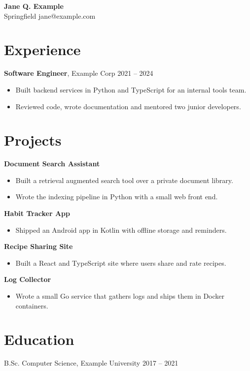 \documentclass[11pt]{article}
\begin{document}
{\LARGE \textbf{Jane Q. Example}}\\
Springfield \quad jane@example.com

\section*{Experience}
\textbf{Software Engineer}, Example Corp \hfill 2021 -- 2024
\begin{itemize}
  \item Built backend services in Python and TypeScript for an internal tools team.
  \item Reviewed code, wrote documentation and mentored two junior developers.
\end{itemize}

\section*{Projects}

\textbf{Document Search Assistant}
\begin{itemize}
  \item Built a retrieval augmented search tool over a private document library.
  \item Wrote the indexing pipeline in Python with a small web front end.
\end{itemize}

\textbf{Habit Tracker App}
\begin{itemize}
  \item Shipped an Android app in Kotlin with offline storage and reminders.
\end{itemize}

\textbf{Recipe Sharing Site}
\begin{itemize}
  \item Built a React and TypeScript site where users share and rate recipes.
\end{itemize}

\textbf{Log Collector}
\begin{itemize}
  \item Wrote a small Go service that gathers logs and ships them in Docker containers.
\end{itemize}

\section*{Education}
B.Sc. Computer Science, Example University \hfill 2017 -- 2021
\end{document}
